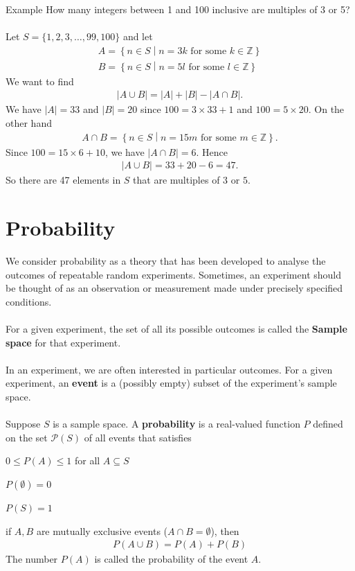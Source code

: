 \documentclass{report}
\begin{document}
\begin{enumerate}
		\begin{question}{Example}
			How many integers between 1 and 100 inclusive are multiples of 3 or 5?
			\\ \\
			Let $S = \{1,2,3, \dots, 99, 100\}$ and let
			\begin{align*}
				A = \left\{n \in S \middle| n = 3k \text{ for some } k \in \mathbb{Z}\right\}	\\
				B = \left\{n \in S \middle| n = 5l \text{ for some } l \in \mathbb{Z}\right\}
			\end{align*}
			We want to find
			\begin{align*}
				|A \cup B| = |A| + |B| - |A \cap B|.
			\end{align*}
			We have $|A| = 33$ and $|B| = 20$ since $100 = 3 \times 33 + 1$ and $100 = 5 \times 20$. On the other hand
			\begin{align*}
				A \cap B = \left\{n \in S \middle| n = 15m \text{ for some } m \in \mathbb{Z} \right\}.
			\end{align*}
			Since $100 = 15 \times 6 + 10$, we have $|A \cap B| = 6$. Hence
			\begin{align*}
				|A \cup B| = 33 + 20 - 6 = 47.
			\end{align*}
			So there are 47 elements in $S$ that are multiples of $3$ or $5$.
		\end{question}
	
	\section{Probability}

		We consider probability as a theory that has been developed to analyse the outcomes of repeatable random experiments. Sometimes, an experiment should be thought of as an observation or measurement made under precisely specified conditions.
		\\ \\
		For a given experiment, the set of all its possible outcomes is called the \textbf{Sample space} for that experiment.
		\\ \\
		In an experiment, we are often interested in particular outcomes. For a given experiment, an \textbf{event} is a (possibly empty) subset of the experiment's sample space.
		\\ \\
		Suppose $S$ is a sample space. A \textbf{probability} is a real-valued function $P$ defined on the set $\mathcal{P}(S)$ of all events that satisfies


\end{enumerate}
\end{document}
